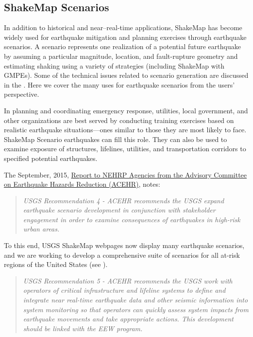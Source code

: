 \documentclass[letterpaper,10pt,english]{sphinxmanual}
\begin{document}
\subsection{ShakeMap Scenarios}
\label{shakemap_archives:shakemap-scenarios}\label{shakemap_archives:sec-scenarios}
In addition to historical and near--real-time applications, ShakeMap has become widely
used for earthquake mitigation and planning exercises through earthquake scenarios.
A scenario represents one realization of a potential future earthquake by assuming a
particular magnitude, location, and fault-rupture geometry and estimating shaking using a
variety of strategies (including ShakeMap with GMPEs).
Some of the technical issues related to scenario generation are discussed in the {\hyperref[technical_guide:technical\string-guide]{}}.
Here we cover the many uses for earthquake scenarios from the users' perspective.

In planning and coordinating emergency response, utilities, local government, and other
organizations are best served by conducting training exercises based on realistic
earthquake situations---ones similar to those they are most likely to face. ShakeMap
Scenario earthquakes can fill this role. They can also be used to examine
exposure of structures, lifelines, utilities, and transportation corridors to specified
potential earthquakes.

The September, 2015, \href{http://nehrp.gov/pdf/2015ACEHRReportFinal.pdf}{Report to NEHRP Agencies from the Advisory Committee on
Earthquake Hazards Reduction (ACEHR)},
notes:
\begin{quote}

\emph{USGS Recommendation 4 - ACEHR recommends the USGS expand earthquake scenario
development in conjunction with stakeholder engagement in order to examine
consequences of earthquakes in high-risk urban areas.}
\end{quote}

To this end, USGS ShakeMap webpages now display many earthquake scenarios, and
we are working to develop a comprehensive suite of scenarios for all at-risk
regions of the United States (see {\hyperref[references:thompson2016]{}}).
\begin{quote}

\emph{USGS Recommendation 5 - ACEHR recommends the USGS work with operators of
critical infrastructure and lifeline systems to define and integrate
near real-time earthquake data and other seismic information into
system monitoring so that operators can quickly assess system
impacts from earthquake movements
and take appropriate actions.  This development should be linked
with the EEW program.}
\end{quote}
\end{document}
